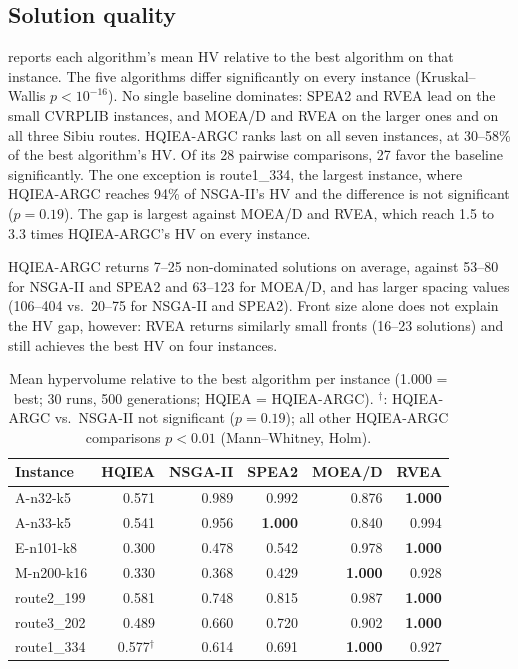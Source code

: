 \subsection{Solution quality}
 reports each algorithm's mean HV relative to the best algorithm on
that instance. The five algorithms differ significantly on every instance
(Kruskal--Wallis $p<10^{-16}$). No single baseline dominates: SPEA2 and RVEA lead
on the small CVRPLIB instances, and MOEA/D and RVEA on the larger ones and on all
three Sibiu routes. HQIEA-ARGC ranks last on all seven instances, at 30--58\% of
the best algorithm's HV. Of its 28 pairwise comparisons, 27 favor the baseline
significantly. The one exception is route1\_334, the largest instance, where
HQIEA-ARGC reaches 94\% of NSGA-II's HV and the difference is not significant
($p=0.19$). The gap is largest against MOEA/D and RVEA, which reach 1.5 to 3.3
times HQIEA-ARGC's HV on every instance.

HQIEA-ARGC returns 7--25 non-dominated solutions on average, against 53--80
for NSGA-II and SPEA2 and 63--123 for MOEA/D, and has larger spacing values
(106--404 vs.\ 20--75 for NSGA-II and SPEA2). Front size alone does not explain
the HV gap, however: RVEA returns similarly small fronts (16--23 solutions) and
still achieves the best HV on four instances.

\begin{table}[t]
\centering
\caption{Mean hypervolume relative to the best algorithm per instance (1.000 =
best; 30 runs, 500 generations; HQIEA = HQIEA-ARGC). $^\dagger$: HQIEA-ARGC vs.\ NSGA-II not
significant ($p=0.19$); all other HQIEA-ARGC comparisons $p<0.01$ (Mann--Whitney,
Holm).}
\label{tab:hv}
\setlength{\tabcolsep}{4pt}
\begin{tabular}{@{}lrrrrr@{}}
\toprule
Instance & HQIEA & NSGA-II & SPEA2 & MOEA/D & RVEA \\
\midrule
A-n32-k5    & 0.571 & 0.989 & 0.992 & 0.876 & \textbf{1.000} \\
A-n33-k5    & 0.541 & 0.956 & \textbf{1.000} & 0.840 & 0.994 \\
E-n101-k8   & 0.300 & 0.478 & 0.542 & 0.978 & \textbf{1.000} \\
M-n200-k16  & 0.330 & 0.368 & 0.429 & \textbf{1.000} & 0.928 \\
route2\_199 & 0.581 & 0.748 & 0.815 & 0.987 & \textbf{1.000} \\
route3\_202 & 0.489 & 0.660 & 0.720 & 0.902 & \textbf{1.000} \\
route1\_334 & 0.577$^\dagger$ & 0.614 & 0.691 & \textbf{1.000} & 0.927 \\
\bottomrule
\end{tabular}
\end{table}

